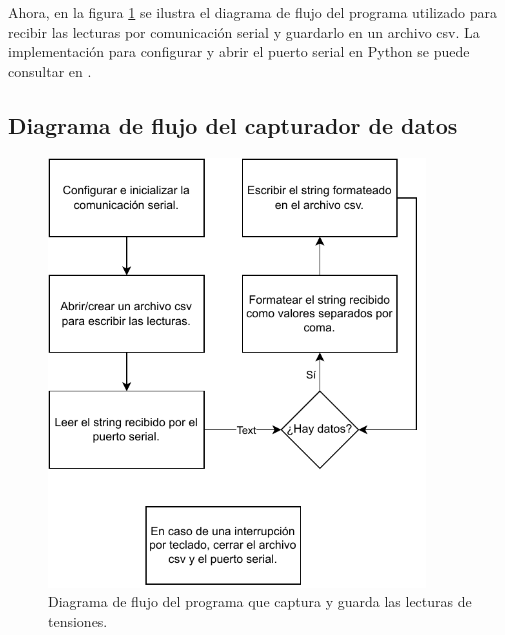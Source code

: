 Ahora, en la figura \ref{fsm-py} se ilustra el diagrama de flujo del programa utilizado para recibir las lecturas por comunicación serial y guardarlo en un archivo csv. La implementación para configurar y abrir el puerto serial en Python se puede consultar en \cite{serial}.
\subsection{Diagrama de flujo del capturador de datos}
\begin{figure}[H]
    \centering
    \includegraphics[width=10cm]{Imagenes/fsm_py.pdf}
    \caption{Diagrama de flujo del programa que captura y guarda las lecturas de tensiones.}
    \label{fsm-py}
\end{figure}